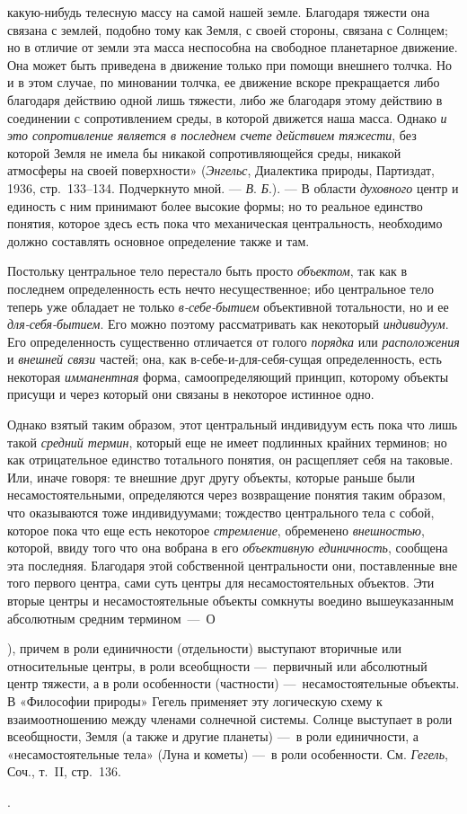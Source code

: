 \documentclass[twoside]{article}
\begin{document}
{{{{{{какую-нибудь телесную массу на самой нашей земле. Благодаря
тяжести она связана с землей, подобно тому как Земля, с своей стороны,
связана с Солнцем; но в отличие от земли эта масса неспособна на свободное
планетарное движение. Она может быть приведена в движение только при помощи
внешнего толчка. Но и в этом случае, по миновании толчка, ее движение
вскоре прекращается либо благодаря действию одной лишь тяжести, либо же
благодаря этому действию в соединении с сопротивлением среды, в которой
движется наша масса. Однако {\em и это сопротивление является в последнем 
счете действием тяжести}, без которой Земля не имела бы никакой 
сопротивляющейся среды, никакой атмосферы на своей поверхности»
({\em Энгельс}, Диалектика природы, Партиздат, 1936, стр.~133–134.
Подчеркнуто мной. — {\em В}. {\em Б}.)}\label{bkm:bm73}.
— В области
{\em духовного} центр и
единость с ним принимают более высокие формы; но то реальное единство
понятия, которое здесь есть пока что механическая центральность, необходимо
должно составлять основное определение также и там.

Постольку центральное тело перестало быть просто
{\em объектом}, так как в
последнем определенность есть нечто несущественное; ибо центральное тело
теперь уже обладает не только
{\em в-себе-бытием}
объективной тотальности, но и ее
{\em для-себя-бытием}.
Его можно поэтому рассматривать как некоторый
{\em индивидуум}. Его
определенность существенно отличается от голого
{\em порядка} или
{\em расположения} и
{\em внешней связи}
частей; она, как в-себе-и-для-себя-сущая определенность, есть
некоторая {\em имманентная}
форма, самоопределяющий принцип, которому объекты присущи и
через который они связаны в некоторое истинное одно.

Однако взятый таким образом, этот центральный индивидуум есть
пока что лишь такой {\em средний
термин}, который еще не имеет подлинных крайних терминов; но
как отрицательное единство тотального понятия, он расщепляет себя на
таковые. Или, иначе говоря: те внешние друг другу объекты, которые раньше
были несамостоятельными, определяются через возвращение понятия таким
образом, что оказываются тоже индивидуумами; тождество центрального тела с
собой, которое пока что еще есть некоторое
{\em стремление},
обременено
{\em внешностью},
которой, ввиду того что она вобрана в его
{\em объективную единичность},
сообщена эта последняя. Благодаря этой собственной
центральности они, поставленные вне того первого центра, сами суть центры
для несамостоятельных объектов. Эти вторые центры и несамостоятельные
объекты сомкнуты воедино вышеуказанным абсолютным средним
термином~—~О}),
причем в роли единичности (отдельности) выступают вторичные
или относительные центры, в роли всеобщности —~первичный или
абсолютный центр тяжести, а в роли особенности (частности)
—~несамостоятельные объекты. В «Философии природы» Гегель
применяет эту логическую схему к взаимоотношению между членами солнечной
системы. Солнце выступает в роли всеобщности, Земля (а также и другие
планеты) —~в роли единичности, а «несамостоятельные тела»
(Луна и кометы) —~в роли особенности. См. {\em Гегель}, Соч., т.~II, стр.~136.}\label{bkm:bm74}.

}}}
\end{document}
